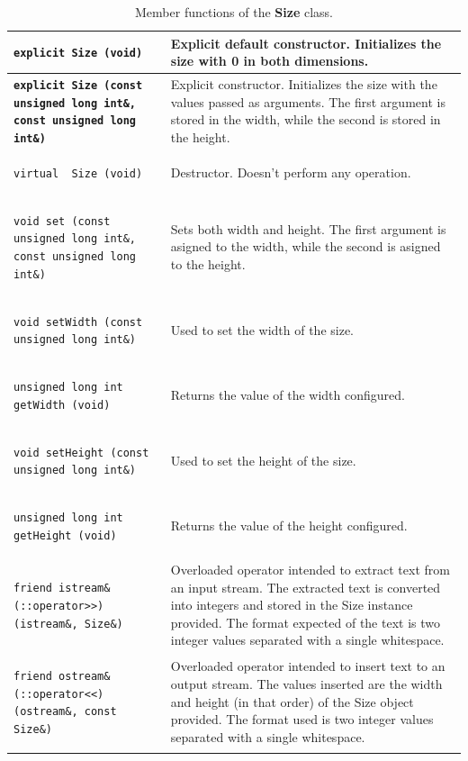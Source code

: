 \documentclass[11pt,twoside,openany,x11names,svgnames]{memoir}
\begin{document}
\begin{table}[h]\footnotesize
\centering
\begin{tabular}{| >{\bfseries}p{10.5cm} | p{5cm} |}
	\hline
	
	\texttt{explicit Size (void)} & Explicit default constructor. Initializes the size with 0 in both dimensions. \\
	
	\hline
	
	\texttt{explicit Size (const unsigned long int\&, const unsigned long int\&)} & Explicit constructor. Initializes the size with the values passed as arguments. The first argument is stored in the width, while the second is stored in the height. \\
	
	\hline
	
	\texttt{virtual ~Size (void)} & Destructor. Doesn't perform any operation. \\
	
	\hline
	
	\texttt{void set (const unsigned long int\&, const unsigned long int\&)} & Sets both width and height. The first argument is asigned to the width, while the second is asigned to the height. \\
	
	\hline	
	
	\texttt{void setWidth (const unsigned long int\&)} & Used to set the width of the size. \\
	
	\hline
	
	\texttt{unsigned long int getWidth (void)} & Returns the value of the width configured. \\
	
	\hline	
	
	\texttt{void setHeight (const unsigned long int\&)} & Used to set the height of the size. \\
	
	\hline
	
	\texttt{unsigned long int getHeight (void)} & Returns the value of the height configured. \\
	
	\hline
	
	\texttt{friend istream\& (::operator>>) (istream\&, Size\&)} & Overloaded operator intended to extract text from an input stream. The extracted text is converted into integers and stored in the Size instance provided. The format expected of the text is two integer values separated with a single whitespace. \\
	
	\hline
	
	\texttt{friend ostream\& (::operator<<) (ostream\&, const Size\&)} & Overloaded operator intended to insert text to an output stream. The values inserted are the width and height (in that order) of the Size object provided. The format used is two integer values separated with a single whitespace. \\
	
	\hline
\end{tabular}
\caption{Member functions of the \textbf{Size} class.}
\label{tab:Size-MemberFunctions}
\end{table}
\end{document}
